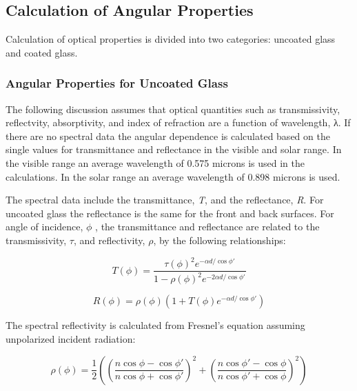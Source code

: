 \subsection{Calculation of Angular Properties}\label{calculation-of-angular-properties}

Calculation of optical properties is divided into two categories: uncoated glass and coated glass.

\subsubsection{Angular Properties for Uncoated Glass}\label{angular-properties-for-uncoated-glass}

The following discussion assumes that optical quantities such as transmissivity, reflectvity, absorptivity, and index of refraction are a function of wavelength, λ. If there are no spectral data the angular dependence is calculated based on the single values for transmittance and reflectance in the visible and solar range. In the visible range an average wavelength of 0.575 microns is used in the calculations. In the solar range an average wavelength of 0.898 microns is used.

The spectral data include the transmittance, \emph{T}, and the reflectance, \emph{R}. For uncoated glass the reflectance is the same for the front and back surfaces. For angle of incidence, \(\phi\) , the transmittance and reflectance are related to the transmissivity, \(\tau\), and reflectivity, \(\rho\), by the following relationships:

\begin{equation}
T(\phi ) = \frac{{\tau {{(\phi )}^2}{e^{ - \alpha d/\cos \phi '}}}}{{1 - \rho {{(\phi )}^2}{e^{ - 2\alpha d/\cos \phi '}}}}
\label{eq:TofPhiEquation}
\end{equation}

\begin{equation}
R(\phi ) = \rho (\phi )\left( {1 + T(\phi ){e^{ - \alpha d/\cos \phi '}}} \right)
\label{eq:RofPhiEquation}
\end{equation}

The spectral reflectivity is calculated from Fresnel's equation assuming unpolarized incident radiation:

\begin{equation}
\rho (\phi ) = \frac{1}{2}\left( {{{\left( {\frac{{n\cos \phi  - \cos \phi '}}{{n\cos \phi  + \cos \phi '}}} \right)}^2} + {{\left( {\frac{{n\cos \phi ' - \cos \phi }}{{n\cos \phi ' + \cos \phi }}} \right)}^2}} \right)
\label{eq:RhoofPhi}
\end{equation}

